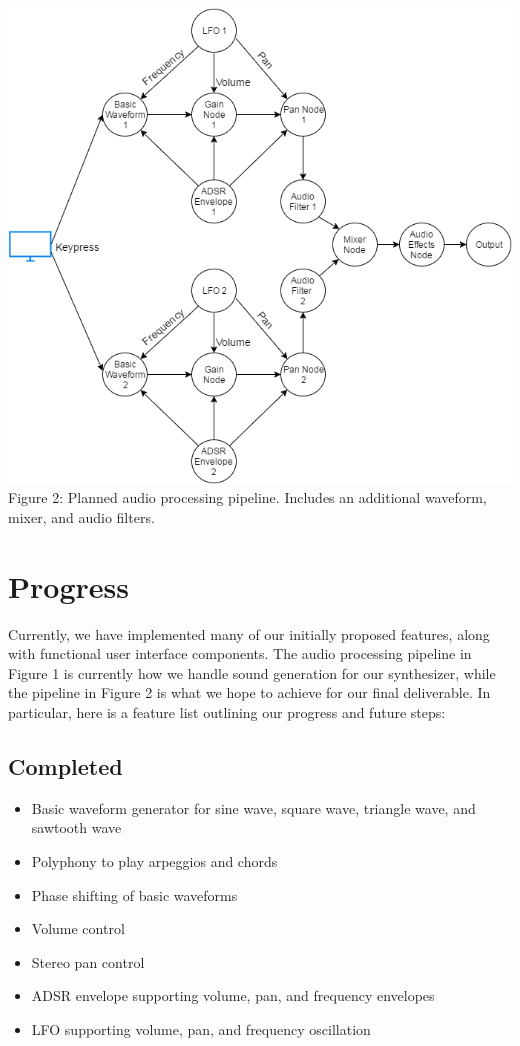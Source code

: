 \documentclass[a4paper, 12pt]{article}
\begin{document}
\null
\vfill
\begin{center}
\includegraphics[scale=0.75]{architecture2.png}
Figure 2: Planned audio processing pipeline. Includes an additional waveform, mixer, and audio filters.
\end{center}
\vfill

\section*{Progress}

Currently, we have implemented many of our initially proposed features, along with functional user interface components. The audio processing pipeline in Figure 1 is currently how we handle sound generation for our synthesizer, while the pipeline in Figure 2 is what we hope to achieve for our final deliverable. In particular, here is a feature list outlining our progress and future steps:

\subsection*{Completed}
\begin{itemize}
\item Basic waveform generator for sine wave, square wave, triangle wave, and sawtooth wave
\item Polyphony to play arpeggios and chords
\item Phase shifting of basic waveforms
\item Volume control
\item Stereo pan control
\item ADSR envelope supporting volume, pan, and frequency envelopes
\item LFO supporting volume, pan, and frequency oscillation
\end{itemize}
\end{document}
